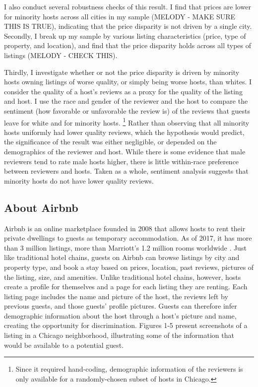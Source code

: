 I also conduct several robustness checks of this result. I find that prices are lower for minority hosts across all cities in my sample (MELODY - MAKE SURE THIS IS TRUE), indicating that the price disparity is not driven by a single city. Secondly, I break up my sample by various listing characteristics (price, type of property, and location), and find that the price disparity holds across all types of listings (MELODY - CHECK THIS). 

Thirdly, I investigate whether or not the price disparity is driven by minority hosts owning listings of worse quality, or simply being worse hosts, than whites. I consider the quality of a host's reviews as a proxy for the quality of the listing and host. I use the race and gender of the reviewer and the host to compare the sentiment (how favorable or unfavorable the review is) of the reviews that guests leave for white and for minority hosts.%
	\footnote{Since it required hand-coding, demographic information of the reviewers is only available for a randomly-chosen subset of hosts in Chicago.} 
Rather than observing that all minority hosts uniformly had lower quality reviews, which the hypothesis would predict, the significance of the result was either negligible, or depended on the demographics of the reviewer and host. While there is some evidence that male reviewers tend to rate male hosts higher, there is little within-race preference between reviewers and hosts. Taken as a whole, sentiment analysis suggests that minority hosts do not have lower quality reviews. 

\subsection{About Airbnb} 
Airbnb is an online marketplace founded in 2008 that allows hosts to rent their private dwellings to guests as temporary accommodation. As of 2017, it has more than 3 million listings, more than Marriott's 1.2 million rooms worldwide \citep{aboutus}. Just like traditional hotel chains, guests on Airbnb can browse listings by city and property type, and book a stay based on prices, location, past reviews, pictures of the listing, size, and amenities. Unlike traditional hotel chains, however, hosts create a profile for themselves and a page for each listing they are renting. Each listing page includes the name and picture of the host, the reviews left by previous guests, and those guests' profile pictures. Guests can therefore infer demographic information about the host through a host's picture and name, creating the opportunity for discrimination. Figures 1-5 present screenshots of a listing in a Chicago neighborhood, illustrating some of the information that would be available to a potential guest. 


